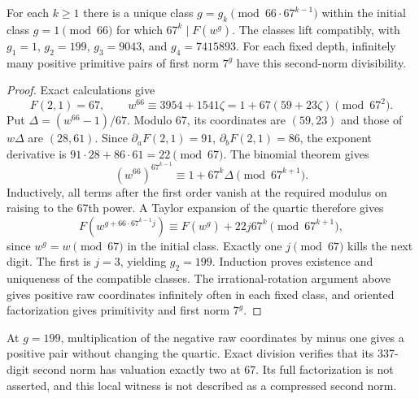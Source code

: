 \begin{theorem}
\label{tt-sixty-seven}
For each $k\ge1$ there is a unique class
$g=g_k\pmod{66\cdot67^{k-1}}$ within the initial class $g=1\pmod{66}$
for which $67^k\mid F(w^g)$. The classes lift compatibly, with
$g_1=1$, $g_2=199$, $g_3=9043$, and $g_4=7415893$.
For each fixed depth, infinitely many positive primitive pairs of first norm
$7^g$ have this second-norm divisibility.
\end{theorem}
\begin{proof}
Exact calculations give
\[
 F(2,1)=67,\qquad
 w^{66}\equiv3954+1541\zeta
 =1+67(59+23\zeta)\pmod{67^2}.
\]
Put $\Delta=(w^{66}-1)/67$. Modulo 67, its coordinates are $(59,23)$
and those of $w\Delta$ are $(28,61)$. Since
$\partial_aF(2,1)=91$, $\partial_bF(2,1)=86$, the exponent derivative is
$91\cdot28+86\cdot61=22\pmod{67}$.
The binomial theorem gives
\[
 (w^{66})^{67^{k-1}}\equiv1+67^k\Delta\pmod{67^{k+1}}.
\]
Inductively, all terms after the first order vanish at the required modulus
on raising to the 67th power. A Taylor expansion of the quartic therefore gives
\[
 F(w^{g+66\cdot67^{k-1}j})
 \equiv F(w^g)+22j67^k\pmod{67^{k+1}},
\]
since $w^g=w\pmod{67}$ in the initial class. Exactly one $j\pmod{67}$
kills the next digit. The first is $j=3$, yielding $g_2=199$.
Induction proves existence and uniqueness of the compatible classes.
The irrational-rotation argument above gives positive raw coordinates
infinitely often in each fixed class, and oriented factorization gives
primitivity and first norm $7^g$.
\end{proof}

At $g=199$, multiplication of the negative raw coordinates by minus one gives
a positive pair without changing the quartic. Exact division verifies that
its 337-digit second norm has valuation exactly two at 67. Its full
factorization is not asserted, and this local witness is not described as a
compressed second norm.

